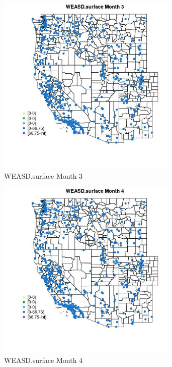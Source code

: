 \begin{figure} 
\centering  
\includegraphics[width=0.77\textwidth]{Code_Outputs/Report_ML_input_PM25_Step4_part_e_de_duplicated_aves_compiled_2019-05-14wNAs_MapObsMo3WEASDsurface.jpg} 
\caption{\label{fig:Report_ML_input_PM25_Step4_part_e_de_duplicated_aves_compiled_2019-05-14wNAsMapObsMo3WEASDsurface}WEASD.surface Month 3} 
\end{figure} 
 

\begin{figure} 
\centering  
\includegraphics[width=0.77\textwidth]{Code_Outputs/Report_ML_input_PM25_Step4_part_e_de_duplicated_aves_compiled_2019-05-14wNAs_MapObsMo4WEASDsurface.jpg} 
\caption{\label{fig:Report_ML_input_PM25_Step4_part_e_de_duplicated_aves_compiled_2019-05-14wNAsMapObsMo4WEASDsurface}WEASD.surface Month 4} 
\end{figure} 
 


